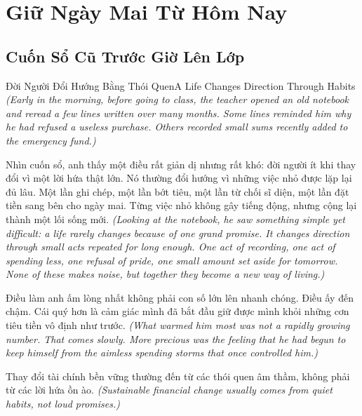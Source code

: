 \chapter{Giữ Ngày Mai Từ Hôm Nay}

\section{Cuốn Sổ Cũ Trước Giờ Lên Lớp}
\begin{truyen}{Đời Người Đổi Hướng Bằng Thói Quen}{A Life Changes Direction Through Habits}
\textit{(Early in the morning, before going to class, the teacher opened an old notebook and reread a few lines written over many months. Some lines reminded him why he had refused a useless purchase. Others recorded small sums recently added to the emergency fund.)}

Nhìn cuốn sổ, anh thấy một điều rất giản dị nhưng rất khó: đời người ít khi thay đổi vì một lời hứa thật lớn. Nó thường đổi hướng vì những việc nhỏ được lặp lại đủ lâu. Một lần ghi chép, một lần bớt tiêu, một lần từ chối sĩ diện, một lần đặt tiền sang bên cho ngày mai. Từng việc nhỏ không gây tiếng động, nhưng cộng lại thành một lối sống mới.
\textit{(Looking at the notebook, he saw something simple yet difficult: a life rarely changes because of one grand promise. It changes direction through small acts repeated for long enough. One act of recording, one act of spending less, one refusal of pride, one small amount set aside for tomorrow. None of these makes noise, but together they become a new way of living.)}

Điều làm anh ấm lòng nhất không phải con số lớn lên nhanh chóng. Điều ấy đến chậm. Cái quý hơn là cảm giác mình đã bắt đầu giữ được mình khỏi những cơn tiêu tiền vô định như trước.
\textit{(What warmed him most was not a rapidly growing number. That comes slowly. More precious was the feeling that he had begun to keep himself from the aimless spending storms that once controlled him.)}
\end{truyen}

\begin{baihoc}
Thay đổi tài chính bền vững thường đến từ các thói quen âm thầm, không phải từ các lời hứa ồn ào.
\textit{(Sustainable financial change usually comes from quiet habits, not loud promises.)}
\end{baihoc}

